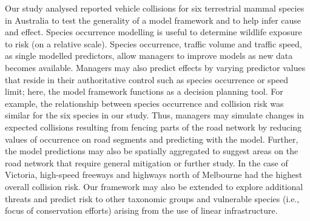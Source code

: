 Our study analysed reported vehicle collisions for six terrestrial mammal species in Australia to test the generality of a model framework and to help infer cause and effect. Species occurrence modelling is useful to determine wildlife exposure to risk (on a relative scale). Species occurrence, traffic volume and traffic speed, as single modelled predictors, allow managers to improve models as new data becomes available. Managers may also predict effects by varying predictor values that reside in their authoritative control such as species occurrence or speed limit; here, the model framework functions as a decision planning tool. For example, the relationship between species occurrence and collision risk was similar for the six species in our study. Thus, managers may simulate changes in expected collisions resulting from fencing parts of the road network by reducing values of occurrence on road segments and predicting with the model. Further, the model predictions may also be spatially aggregated to suggest areas on the road network that require general mitigation or further study.  In the case of Victoria, high-speed freeways and highways north of Melbourne had the highest overall collision risk. Our framework may also be extended to explore additional threats and predict risk to other taxonomic groups and vulnerable species (i.e., focus of conservation efforts) arising from the use of linear infrastructure.

